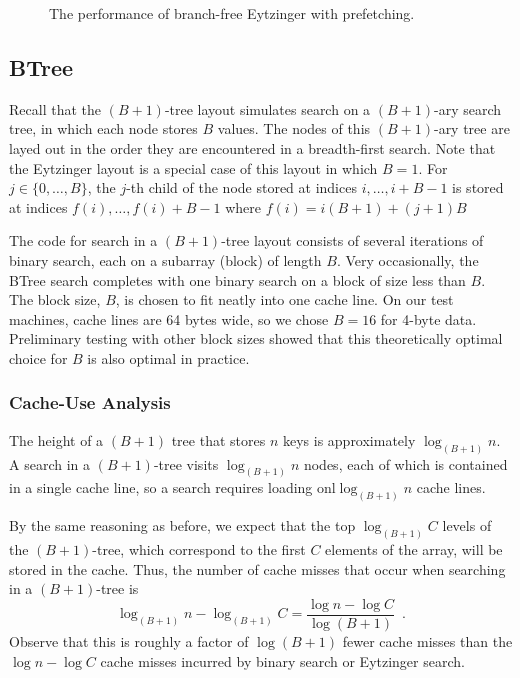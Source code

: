 \documentclass{patmorin}
\begin{document}
\begin{figure}
   \caption{The performance of branch-free Eytzinger with prefetching.}
\end{figure}

\subsection{BTree}

Recall that the $(B+1)$-tree layout simulates search on a $(B+1)$-ary
search tree, in which each node stores $B$ values.  The nodes of this
$(B+1)$-ary tree are layed out in the order they are encountered in a
breadth-first search.  Note that the Eytzinger layout is a special case
of this layout in which $B=1$.  For $j\in\{0,\ldots,B\}$, the $j$-th
child of the node stored at indices $i,\ldots,i+B-1$ is stored at
indices $f(i),\ldots,f(i)+B-1$ where $f(i)=i(B+1)+(j+1)B$

The code for search in a $(B+1)$-tree layout consists of several
iterations of binary search, each on a subarray (block) of length
$B$. Very occasionally, the BTree search completes with one binary search
on a block of size less than $B$. The block size, $B$, is chosen to fit
neatly into one cache line. On our test machines, cache lines are 64
bytes wide, so we chose $B=16$ for 4-byte data. Preliminary testing with
other block sizes showed that this theoretically optimal choice for $B$
is also optimal in practice.


\subsubsection{Cache-Use Analysis}

The height of a $(B+1)$ tree that stores $n$ keys is approximately
$\log_{(B+1)} n$.  A search in a $(B+1)$-tree visits $\log_{(B+1)} n$
nodes, each of which is contained in a single cache line, so a search
requires loading onl$\log_{(B+1)} n$ cache lines.

By the same reasoning as before, we expect that the top $\log_{(B+1)} C$
levels of the $(B+1)$-tree, which correspond to the first $C$ elements
of the array, will be stored in the cache.  Thus, the number of cache
misses that occur when searching in a $(B+1)$-tree is
\[
    \log_{(B+1)}n - \log_{(B+1)} C 
         = \frac{\log n - \log C}{\log (B+1)} \enspace .
\]
Observe that this is roughly a factor of $\log(B+1)$ fewer cache misses
than the $\log n-\log C$ cache misses incurred by binary search or
Eytzinger search.
\end{document}
